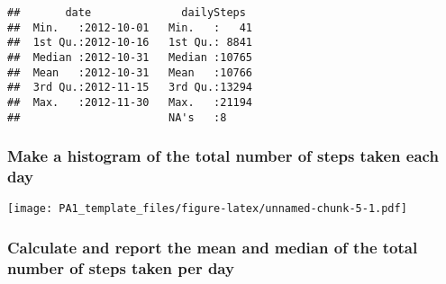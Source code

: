 \documentclass[]{article}
\newenvironment{Shaded}{\begin{snugshade}}{\end{snugshade}}
\newcommand{\CommentTok}[1]{\textcolor[rgb]{0.56,0.35,0.01}{\textit{#1}}}
\newcommand{\DataTypeTok}[1]{\textcolor[rgb]{0.13,0.29,0.53}{#1}}
\newcommand{\DecValTok}[1]{\textcolor[rgb]{0.00,0.00,0.81}{#1}}
\newcommand{\FloatTok}[1]{\textcolor[rgb]{0.00,0.00,0.81}{#1}}
\newcommand{\KeywordTok}[1]{\textcolor[rgb]{0.13,0.29,0.53}{\textbf{#1}}}
\newcommand{\NormalTok}[1]{#1}
\newcommand{\OperatorTok}[1]{\textcolor[rgb]{0.81,0.36,0.00}{\textbf{#1}}}
\newcommand{\StringTok}[1]{\textcolor[rgb]{0.31,0.60,0.02}{#1}}
\begin{document}
\begin{verbatim}
##       date              dailySteps   
##  Min.   :2012-10-01   Min.   :   41  
##  1st Qu.:2012-10-16   1st Qu.: 8841  
##  Median :2012-10-31   Median :10765  
##  Mean   :2012-10-31   Mean   :10766  
##  3rd Qu.:2012-11-15   3rd Qu.:13294  
##  Max.   :2012-11-30   Max.   :21194  
##                       NA's   :8
\end{verbatim}

\hypertarget{make-a-histogram-of-the-total-number-of-steps-taken-each-day}{%
\subsubsection{Make a histogram of the total number of steps taken each
day}\label{make-a-histogram-of-the-total-number-of-steps-taken-each-day}}

\begin{Shaded}
\end{Shaded}

\texttt{[image: PA1\_template\_files/figure-latex/unnamed-chunk-5-1.pdf]}

\hypertarget{calculate-and-report-the-mean-and-median-of-the-total-number-of-steps-taken-per-day}{%
\subsubsection{Calculate and report the mean and median of the total
number of steps taken per
day}\label{calculate-and-report-the-mean-and-median-of-the-total-number-of-steps-taken-per-day}}
\end{document}
